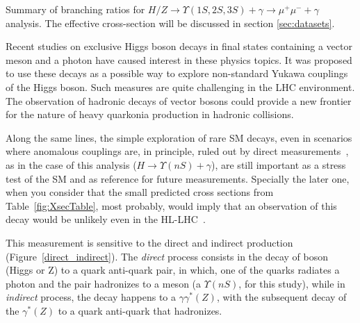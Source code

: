 \begin{table}[htp]
  \begin{center}
    \caption{Summary of branching ratios for $H/Z \rightarrow \Upsilon(1S,2S,3S)+\gamma  \rightarrow \mu^{+} \mu^{-} +\gamma$ analysis. The effective cross-section will be discussed in section \ref{sec:datasets}.}
    
    \label{fig:XsecTable}
  \end{center}
\end{table}






Recent studies on exclusive Higgs boson decays \cite{ISIDORI2014131,PhysRevLett.114.101802,GAO2014366} in final states containing a vector meson and a photon have caused interest in these physics topics. It was proposed to use these decays as a possible way to explore non-standard Yukawa couplings of the Higgs boson. Such measures are quite challenging in the LHC environment. The observation of hadronic decays of vector bosons could provide a new frontier for the nature of heavy quarkonia production in hadronic collisions.

Along the same lines, the simple exploration of rare SM decays, even in scenarios where anomalous couplings are, in principle, ruled out by direct measurements~\cite{cms_h_to_bb_PhysRevLett.121.121801}, as in the case of this analysis ($H \rightarrow \Upsilon(nS) + \gamma$), are still important as a stress test of the SM and as reference for future measurements. Specially the later one, when you consider that the small predicted cross sections from Table~\ref{fig:XsecTable}, most probably, would imply that an observation of this decay would be unlikely even in the HL-LHC~\cite{hl_lhc}.

This measurement is sensitive to the direct and indirect production (Figure~\ref{direct_indirect}). The \textit{direct} process consists in the decay of boson (Higgs or Z) to a quark anti-quark pair, in which, one of the quarks radiates a photon and the pair hadronizes to a meson (a $\Upsilon(nS)$, for this study), while in \textit{indirect} process, the decay happens to a $\gamma \gamma^{*}(Z)$, with the subsequent decay of the $\gamma^{*}(Z)$ to a quark anti-quark that hadronizes. 


